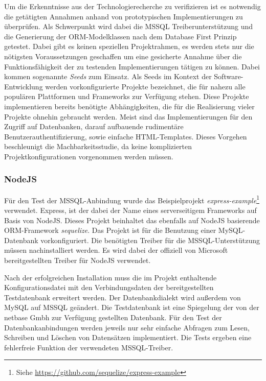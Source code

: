 Um die Erkenntnisse aus der Technologierecherche zu verifizieren ist es notwendig die getätigten Annahmen anhand von prototypischen Implementierungen zu überprüfen. Als Schwerpunkt wird dabei die MSSQL Treiberunterstützung und die Generierung der ORM-Modelklassen nach dem Database First Prinzip getestet. Dabei gibt es keinen speziellen Projektrahmen, es werden stets nur die nötigsten Voraussetzungen geschaffen um eine gesicherte Annahme über die Funktionsfähigkeit der zu testenden Implementierungen tätigen zu können. Dabei kommen sogenannte \emph{Seeds} zum Einsatz. Als Seeds im Kontext der Software-Entwicklung werden vorkonfigurierte Projekte bezeichnet, die für nahezu alle populären Plattformen und Frameworks zur Verfügung stehen. Diese Projekte implementieren bereits benötigte Abhängigkeiten, die für die Realisierung vieler Projekte ohnehin gebraucht werden. Meist sind das Implementierungen für den Zugriff auf Datenbanken, darauf aufbauende rudimentäre Benutzerauthentifizierung, sowie einfache HTML-Templates. Dieses Vorgehen beschleunigt die Machbarkeitsstudie, da keine komplizierten Projektkonfigurationen vorgenommen werden müssen.

\subsubsection{NodeJS}

Für den Test der MSSQL-Anbindung wurde das Beispielprojekt \emph{express-example}\footnote{Siehe \hyperlink{https://github.com/sequelize/express-example}{https://github.com/sequelize/express-example}} verwendet. Express, ist der dabei der Name eines serverseitigem Frameworks auf Basis von NodeJS. Dieses Projekt beinhaltet das ebenfalls auf NodeJS basierende ORM-Framework \emph{sequelize}. Das Projekt ist für die Benutzung einer MySQL-Datenbank vorkonfiguriert. Die benötigten Treiber für die MSSQL-Unterstützung müssen nachinstalliert werden. Es wird dabei der offiziell von Microsoft bereitgestellten Treiber für NodeJS verwendet.

Nach der erfolgreichen Installation muss die im Projekt enthaltende Konfigurationsdatei mit den Verbindungsdaten der bereitgestellten Testdatenbank erweitert werden. Der Datenbankdialekt wird außerdem von MySQL auf MSSQL geändert. Die Testdatenbank ist eine Spiegelung der von der netbase Gmbh zur Verfügung gestellten Datenbank. Für den Test der Datenbankanbindungen werden jeweils nur sehr einfache Abfragen zum Lesen, Schreiben und Löschen von Datensätzen implementiert. Die Tests ergeben eine fehlerfreie Funktion der verwendeten MSSQL-Treiber.

